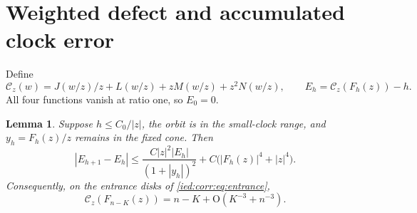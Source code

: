 \documentclass[11pt,letterpaper]{article}
\newtheorem{lemma}[theorem]{Lemma}
\theoremstyle{remark}\newtheorem{remark}[theorem]{Remark}
\newcommand{\Oh}{\mathrm O}\newcommand{\supp}{\operatorname{supp}}
\begin{document}
\section{Weighted defect and accumulated clock error}\label{ied:corr:sec:defect}
Define
\begin{equation}\label{ied:corr:eq:C3}
 \mathcal C_z(w)=J(w/z)/z+L(w/z)+zM(w/z)+z^2N(w/z),
 \qquad E_h=\mathcal C_z(F_h(z))-h.
\end{equation}
All four functions vanish at ratio one, so $E_0=0$.
\begin{lemma}\label{ied:corr:lem:defect}
Suppose $h\le C_0/|z|$, the orbit is in the small-clock range, and $y_h=F_h(z)/z$ remains in the fixed cone. Then
\begin{equation}\label{ied:corr:eq:weighted}
 |E_{h+1}-E_h|\le
 \frac{C|z|^2|E_h|}{(1+|y_h|)^2}+C\bigl(|F_h(z)|^4+|z|^4\bigr).
\end{equation}
Consequently, on the entrance disks of \eqref{ied:corr:eq:entrance},
\begin{equation}\label{ied:corr:eq:Cerror}
 \mathcal C_z(F_{n-K}(z))=n-K+\Oh(K^{-3}+n^{-3}).
\end{equation}
\end{lemma}
\end{document}
